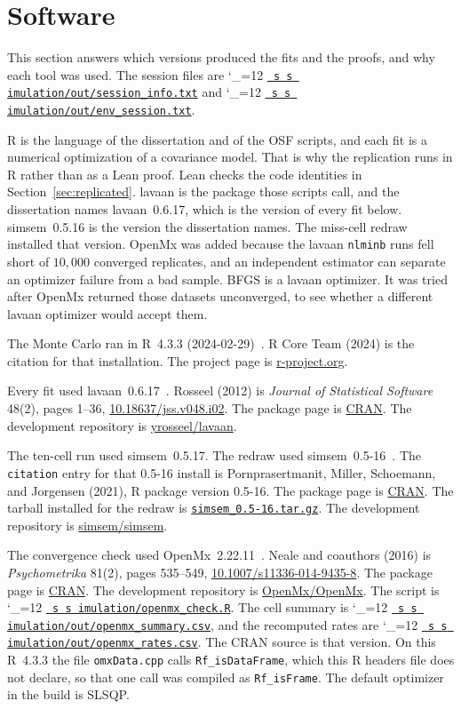 \documentclass[11pt]{article}
\makeatletter
\newcommand{\proofbase}{https://github.com/alectionary/vibe-math/blob/master/formalization/latent-contrasts}
\def\latent@show#1{%
  \ifx\relax#1\else
    #1\allowbreak
    \expandafter\latent@show
  \fi}
\newcommand{\src}{\begingroup\catcode`\_=12 \latent@src}
\newcommand{\latent@src}[1]{%
  \edef\srcurl{\proofbase/#1}%
  \href{\srcurl}{\texttt{\latent@show#1\relax}}\endgroup}
\newcommand{\srcat}{\begingroup\catcode`\_=12 \latent@srcat}
\newcommand{\latent@srcat}[2]{%
  \edef\srcurl{\proofbase/#1\#L#2}%
  \href{\srcurl}{\texttt{\latent@show#1\relax}}\endgroup}
\gdef\simsemtar{https://cran.r-project.org/src/contrib/Archive/simsem/simsem_0.5-16.tar.gz}
\makeatother
\begin{document}
\section{Software}
\label{sec:software}

This section answers which versions produced the fits and the proofs,
and why each tool was used.
The session files are \src{simulation/out/session_info.txt} and
\src{simulation/out/env_session.txt}.

R is the language of the dissertation and of the OSF scripts, and each
fit is a numerical optimization of a covariance model. That is why the
replication runs in R rather than as a Lean proof. Lean checks the code
identities in Section~\ref{sec:replicated}.
lavaan is the package those scripts call, and the dissertation names
lavaan~0.6.17, which is the version of every fit below.
simsem~0.5.16 is the version the dissertation names. The miss-cell
redraw installed that version.
OpenMx was added because the lavaan \texttt{nlminb} runs fell short of
\(10{,}000\) converged replicates, and an independent estimator can
separate an optimizer failure from a bad sample.
BFGS is a lavaan optimizer. It was tried after OpenMx returned those
datasets unconverged, to see whether a different lavaan optimizer
would accept them.

The Monte Carlo ran in R~4.3.3 (2024-02-29)~\cite{rcore}.
R Core Team (2024) is the citation for that installation.
The project page is \href{https://www.r-project.org/}{r-project.org}.

Every fit used lavaan~0.6.17~\cite{rosseel2012}.
Rosseel (2012) is \emph{Journal of Statistical Software} 48(2), pages
1--36,
\href{https://doi.org/10.18637/jss.v048.i02}{10.18637/jss.v048.i02}.
The package page is
\href{https://cran.r-project.org/package=lavaan}{CRAN}.
The development repository is
\href{https://github.com/yrosseel/lavaan}{yrosseel/lavaan}.

The ten-cell run used simsem~0.5.17.
The redraw used simsem~0.5-16~\cite{simsem}.
The \texttt{citation} entry for that 0.5-16 install is Pornprasertmanit,
Miller, Schoemann, and Jorgensen (2021), R package version 0.5-16.
The package page is
\href{https://cran.r-project.org/package=simsem}{CRAN}.
The tarball installed for the redraw is
\href{\simsemtar}{\texttt{simsem\_0.5-16.tar.gz}}.
The development repository is
\href{https://github.com/simsem/simsem}{simsem/simsem}.

The convergence check used OpenMx~2.22.11~\cite{neale2016}.
Neale and coauthors (2016) is \emph{Psychometrika} 81(2), pages
535--549,
\href{https://doi.org/10.1007/s11336-014-9435-8}{10.1007/s11336-014-9435-8}.
The package page is
\href{https://cran.r-project.org/package=OpenMx}{CRAN}.
The development repository is
\href{https://github.com/OpenMx/OpenMx}{OpenMx/OpenMx}.
The script is \srcat{simulation/openmx_check.R}{172}.
The cell summary is \src{simulation/out/openmx_summary.csv},
and the recomputed rates are \src{simulation/out/openmx_rates.csv}.
The CRAN source is that version. On this R~4.3.3 the file
\texttt{omxData.cpp} calls \texttt{Rf\_isDataFrame}, which this R
headers file does not declare, so that one call was compiled as
\texttt{Rf\_isFrame}. The default optimizer in the build is SLSQP.
\end{document}
